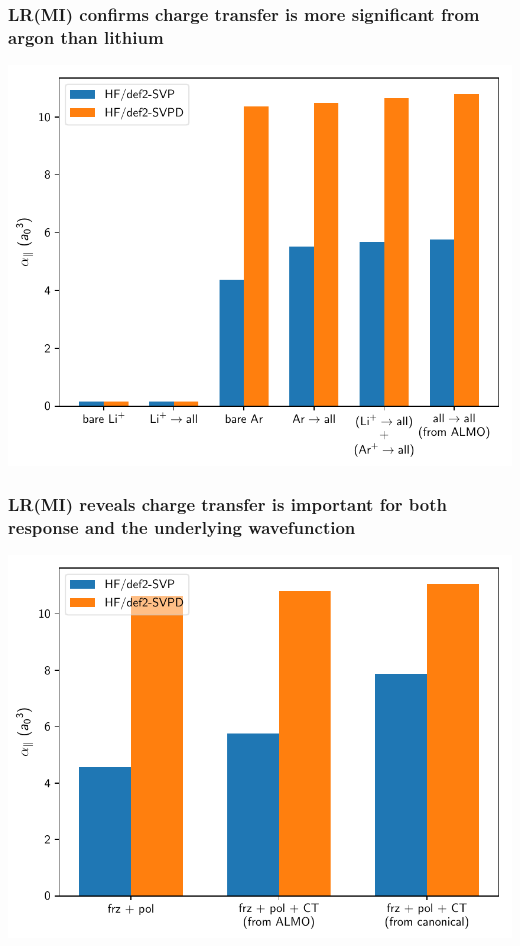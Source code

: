 \documentclass[%
    xcolor=usenames,dvipsnames,svgnames%
]{beamer}
\newenvironment{nscenter}
 {\parskip=0pt\par\nopagebreak\centering}
 {\par\noindent\ignorespacesafterend}
\begin{document}
\begin{frame}
  \frametitle{LR(MI) confirms charge transfer is more significant from argon than lithium}
  \begin{nscenter}
    \includegraphics[scale=0.70]{./figures/bar_virtual_combined.pdf}
  \end{nscenter}
\end{frame}

\begin{frame}
  \frametitle{LR(MI) reveals charge transfer is important for both response and the underlying wavefunction}
  \begin{nscenter}
    \includegraphics[scale=0.70]{./figures/bar_mechanisms_combined.pdf}
  \end{nscenter}
\end{frame}
\end{document}
